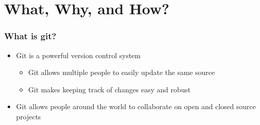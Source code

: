 \documentclass[unknownkeysallowed]{beamer}
\begin{document}
\section{What, Why, and How?}
\begin{frame}
    \frametitle{What is git?}
    \begin{itemize}
        \item{Git is a powerful version control system}
            \begin{itemize}
                \item{Git allows multiple people to easily update the same source}
                \item{Git makes keeping track of changes easy and robust}
            \end{itemize}
        \item{Git allows people around the world to collaborate on open and closed source projects}
    \end{itemize}
    \vspace{1cm} %




\end{frame}
\end{document}
